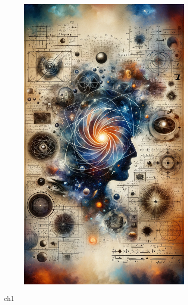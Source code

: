 \documentclass[11pt, letterpaper, openany]{book}
\begin{document}
\begin{figure}[htbp]
  \centering
  \includegraphics[width=0.75\textwidth]{titleCover2.png}
\end{figure}
\FloatBarrier

\mainmatter
 {ch1}
\end{document}
